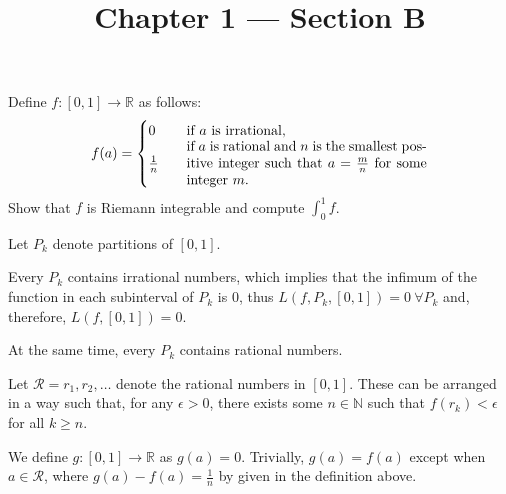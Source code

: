 \documentclass[11pt, a4paper, tikz]{article}
\newcommand{\centsection}[1]{
	\section*{\centering{#1}}
}
\newcommand{\Int}[2]{\displaystyle \int_{#1}^{#2}}
\newcommand{\naturals}{
	\ensuremath{\mathbb{N}}
}
\newcommand{\reals}{
	\ensuremath{\mathbb{R}}
}
\begin{document}
	\title{\textbf{Chapter 1 — Section B}}
	\maketitle
	\centsection{Exercise 1}
	
	\begin{formulationBox}
		Define $f:[0,1]\rightarrow\reals$ as follows:
		\[
			f(a) =
			\begin{cases}
				0 &\quad \textrm{if $a$ is irrational,}\\
				\frac{1}{n} &\quad \parbox{.5\linewidth}{if $a$ is rational and $n$ is the smallest positive integer such that $a=\frac{m}{n}$ for some integer $m$.}
			\end{cases}
		\]
		Show that $f$ is Riemann integrable and compute $\Int{0}{1}f$.
	\end{formulationBox}
	
	Let $P_k$ denote partitions of $[0,1]$.
	
	Every $P_k$ contains irrational numbers, which implies that the infimum of the function in each subinterval of $P_k$ is 0, thus $L(f, P_k, [0,1]) = 0\ \forall P_k$ and, therefore, $L(f, [0,1]) = 0$.
	
	At the same time, every $P_k$ contains rational numbers.
	
	Let $\mathcal{R} = r_1, r_2, \dots$ denote the rational numbers in $[0, 1]$. These can be arranged in a way such that, for any $\epsilon>0$, there exists some $n\in\naturals$ such that $f(r_k)<\epsilon$ for all $k\geq n$.
	
	We define $g:[0,1]\rightarrow\reals$ as $g(a) = 0$. Trivially, $g(a)=f(a)$ except when $a\in\mathcal{R}$, where $g(a)-f(a) = \frac{1}{n}$ by given in the definition above.
	
	
\end{document}
